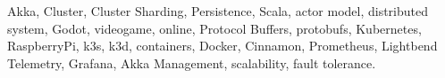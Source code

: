 \noindent Akka, Cluster, Cluster Sharding, Persistence, Scala, actor model, distributed system, Godot, videogame, online, Protocol Buffers, protobufs,
Kubernetes, RaspberryPi, k3s, k3d, containers, Docker, Cinnamon, Prometheus, Lightbend Telemetry, Grafana, Akka Management, scalability, fault tolerance.
